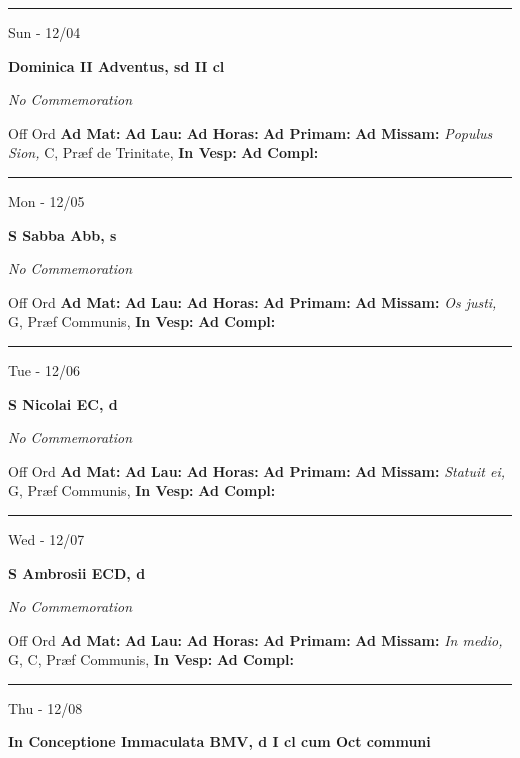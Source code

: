 \documentclass[letterpaper, 10pt]{article}
\begin{document}
\hrule
\begin{center}
Sun - 12/04
\end{center}\textbf{ \large Dominica II Adventus, \textnormal{\normalsize sd II cl}}

\textit{No Commemoration}\begin{justify}
Off Ord
\textbf{Ad Mat: }
\textbf{Ad Lau: }
\textbf{Ad Horas: }
\textbf{Ad Primam: }
\textbf{Ad Missam:} \textit{Populus Sion, } C, Præf de Trinitate, 
\textbf{In Vesp: }
\textbf{Ad Compl: }\end{justify}



\hrule
\begin{center}
Mon - 12/05
\end{center}\textbf{ \large S Sabba Abb, \textnormal{\normalsize s}}

\textit{No Commemoration}\begin{justify}
Off Ord
\textbf{Ad Mat: }
\textbf{Ad Lau: }
\textbf{Ad Horas: }
\textbf{Ad Primam: }
\textbf{Ad Missam:} \textit{Os justi, } G, Præf Communis, 
\textbf{In Vesp: }
\textbf{Ad Compl: }\end{justify}



\hrule
\begin{center}
Tue - 12/06
\end{center}\textbf{ \large S Nicolai EC, \textnormal{\normalsize d}}

\textit{No Commemoration}\begin{justify}
Off Ord
\textbf{Ad Mat: }
\textbf{Ad Lau: }
\textbf{Ad Horas: }
\textbf{Ad Primam: }
\textbf{Ad Missam:} \textit{Statuit ei, } G, Præf Communis, 
\textbf{In Vesp: }
\textbf{Ad Compl: }\end{justify}



\hrule
\begin{center}
Wed - 12/07
\end{center}\textbf{ \large S Ambrosii ECD, \textnormal{\normalsize d}}

\textit{No Commemoration}\begin{justify}
Off Ord
\textbf{Ad Mat: }
\textbf{Ad Lau: }
\textbf{Ad Horas: }
\textbf{Ad Primam: }
\textbf{Ad Missam:} \textit{In medio, } G, C, Præf Communis, 
\textbf{In Vesp: }
\textbf{Ad Compl: }\end{justify}



\hrule
\begin{center}
Thu - 12/08
\end{center}\textbf{ \large In Conceptione Immaculata BMV, \textnormal{\normalsize d I cl cum Oct communi}}
\end{document}
